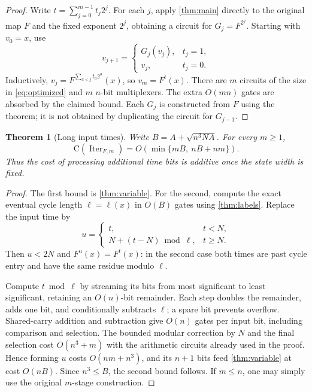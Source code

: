 \documentclass[11pt]{article}
\newtheorem{theorem}{Theorem}[section]
\theoremstyle{definition}
\theoremstyle{remark}
\newcommand{\CC}{\mathrm{C}}
\newcommand{\Iter}{\operatorname{Iter}}
\numberwithin{equation}{section}
\begin{document}
\begin{proof}
Write $t=\sum_{j=0}^{m-1}t_j2^j$.  For each $j$, apply
\cref{thm:main} directly to the original map $F$ and the fixed exponent
$2^j$, obtaining a circuit for $G_j=F^{2^j}$.  Starting with $v_0=x$, use
\[
  v_{j+1}=
  \begin{cases}
    G_j(v_j),&t_j=1,\\
    v_j,&t_j=0.
  \end{cases}
\]
Inductively,
$v_j=F^{\sum_{a<j}t_a2^a}(x)$, so $v_m=F^t(x)$.
There are $m$ circuits of the size in \cref{eq:optimized} and $m$
$n$-bit multiplexers.  The extra $O(mn)$ gates are absorbed by the claimed
bound.  Each $G_j$ is constructed from $F$ using the theorem; it is not
obtained by duplicating the circuit for $G_{j-1}$.
\end{proof}

\begin{theorem}[Long input times]\label{thm:long-time}
Write $B=A+\sqrt{n^3NA}$.  For every $m\geq1$,
\[
 \CC(\Iter_{F,m})=O\!\left(\min\{mB,\ nB+nm\}\right).
\]
Thus the cost of processing additional time bits is additive once the
state width is fixed.
\end{theorem}
\begin{proof}
The first bound is \cref{thm:variable}.  For the second, compute the exact
eventual cycle length $\ell=\ell(x)$ in $O(B)$ gates using
\cref{thm:labels}.  Replace the input time by
\[
 u=\begin{cases}
 t,&t<N,\\
 N+(t-N)\bmod\ell,&t\geq N.
 \end{cases}
\]
Then $u<2N$ and $F^u(x)=F^t(x)$: in the second case both times are past
cycle entry and have the same residue modulo $\ell$.

Compute $t\bmod\ell$ by streaming its bits from most significant to least
significant, retaining an $O(n)$-bit remainder.  Each step doubles the
remainder, adds one bit, and conditionally subtracts $\ell$; a spare bit
prevents overflow.  Shared-carry addition and subtraction give $O(n)$
gates per input bit, including comparison and selection.  The bounded
modular correction by $N$ and the final selection cost $O(n^3+m)$ with
the arithmetic circuits already used in the proof.  Hence forming $u$
costs $O(nm+n^3)$, and its $n+1$ bits feed \cref{thm:variable} at cost
$O(nB)$.  Since $n^3\leq B$, the second bound follows.  If $m\leq n$,
one may simply use the original $m$-stage construction.
\end{proof}
\end{document}
